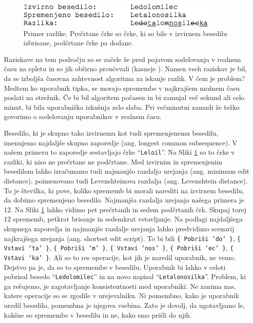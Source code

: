 \documentclass[a4paper, 12pt, twoside]{book}
\begin{document}
\begin{figure}[placement h]
\begin{center}
\includegraphics[width=10cm]{diff.png}
\end{center}
\caption{Primer razlike. Prečrtane črke so črke, ki so bile v izvirnem besedilu izbrisane, podčrtane črke pa dodane.}
\label{diff}
\end{figure}

Raziskave na tem področju so se začele že pred pojavom sodelovanja v realnem času na spletu in so jih obširno proučevali \cite{f-cmpr, o-nd, o-np} (kasneje \cite{diffstrg}). Namen vseh raziskav je bil, da se izboljša časovna zahtevnost algoritma za iskanje razlik. V čem je problem? Medtem ko uporabnik tipka, se morajo spremembe v najkrajšem možnem času poslati na strežnik. Če bi bil algoritem počasen in bi zamujal več sekund ali celo minut, bi bila uporabniška izkušnja zelo slaba. Pri večminutni zamudi že težko govorimo o sodelovanju uporabnikov v realnem času.

Besedilo, ki je skupno tako izvirnemu kot tudi spremenjenemu besedilu, imenujemo najdaljše skupno zaporedje (ang. longest common subsequence). V našem primeru to zaporedje sestavljajo črke “{\tt Leloil}”. Na Sliki \ref{diff} so to črke v razliki, ki niso ne prečrtane ne podčrtane. Med izvirnim in spremenjenim besedilom lahko izračunamo tudi najmanjšo razdaljo urejanja (ang. minimum edit distance), poimenovano tudi Levenshteinova razdalja (ang. Levenshtein distance). To je številka, ki pove, koliko sprememb bi morali narediti na izvirnem besedilu, da dobimo spremenjeno besedilo. Najmanjša razdalja urejanja našega primera je 12. Na Sliki \ref{diff} lahko vidimo pet prečrtanih in sedem podčrtanih črk. Skupaj torej 12 sprememb, petkrat brisanje in sedemkrat vstavljanje. Na podlagi najdaljšega skupnega zaporedja in najmanjše razdalje urejanja lahko predvidimo scenarij najkrajšega urejanja (ang. shortest edit script). To bi bili {\tt \{ Pobriši ‘do’ \}}, {\tt \{ Vstavi ‘ta’ \}}, {\tt \{ Pobriši ‘m’ \}}, {\tt \{ Vstavi ‘nos’ \}}, {\tt \{ Pobriši ‘ec’ \}}, {\tt \{ Vstavi ‘ka’ \}}. Ali so to res operacije, kot jih je naredil uporabnik, ne vemo. Dejstvo pa je, da so to spremembe v besedilu. Uporabnik bi lahko v celoti pobrisal besedo “{\tt Ledolomilec}” in na novo napisal “{\tt Letalonosilka}”. Problem, ki ga rešujemo, je zagotavljanje konsistentnosti med uporabniki. Ne zanima nas, katere operacije so se zgodile v urejevalniku. Ni pomembno, kako je uporabnik uredil besedilo, pomembna je njegova vsebina. Zato je dovolj, da ugotavljamo le, kakšne so spremembe v besedilu in ne, kako smo prišli do njih.
\end{document}
